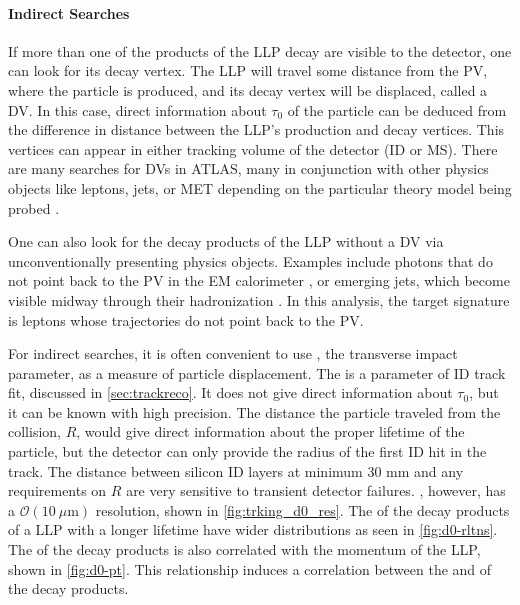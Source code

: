 \paragraph{Indirect Searches} 

If more than one of the products of the \ac{LLP} decay are visible to the detector, one can look for its decay vertex. The \ac{LLP} will travel some distance from the \ac{PV}, where the particle is produced, and its decay vertex will be displaced, called a \ac{DV}. In this case, direct information about $\tau_{0}$ of the particle can be deduced from the difference in distance between the \ac{LLP}'s production and decay vertices. This vertices can appear in either tracking volume of the detector (\ac{ID} or \ac{MS}). There are many searches for \ac{DV}s in \ac{ATLAS}, many in conjunction with other physics objects like leptons, jets, or \ac{MET} depending on the particular theory model being probed \cite{dvplusmu,SUSY-2016-06,SUSY-2014-02,CMS-EXO-18-007,CMS-EXO-17-018,CMS-SUS-14-020}. 

One can also look for the decay products of the \ac{LLP} without a \ac{DV} via unconventionally presenting physics objects. Examples include photons that do not point back to the \ac{PV} in the \ac{EM} calorimeter \cite{SUSY-2013-17}, or emerging jets, which become visible midway through their hadronization \cite{CMS-EXO-18-001}. In this analysis, the target signature is leptons whose trajectories do not point back to the \ac{PV}.

For indirect searches, it is often convenient to use \dzero, the transverse impact parameter, as a measure of particle displacement. The \dzero is a parameter of \ac{ID} track fit, discussed in \autoref{sec:trackreco}. It does not give direct information about $\tau_{0}$, but it can be known with high precision. The distance the particle traveled from the collision, $R$, would give direct information about the proper lifetime of the particle, but the detector can only provide the radius of the first \ac{ID} hit in the track. The distance between silicon \ac{ID} layers at minimum 30 mm and any requirements on $R$ are very sensitive to transient detector failures. \dz, however, has a $\mathcal{O}(10~\mu \textrm{m})$ resolution, shown in \autoref{fig:trking_d0_res}. The \dz of the decay products of a \ac{LLP} with a longer lifetime have wider \dzero distributions as seen in \autoref{fig:d0-rltns}. The \dz of the decay products is also correlated with the momentum of the \ac{LLP}, shown in \autoref{fig:d0-pt}. This relationship induces a correlation between the \pt and \dz of the decay products.


